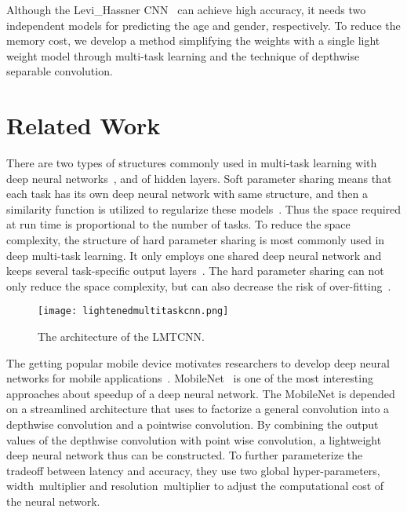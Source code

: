 \documentclass[times, 10pt,twocolumn]{article}
\begin{document}
Although the Levi\_Hassner CNN~\cite{levi2015age} can achieve high accuracy, it needs two independent models for predicting the age and gender, respectively. 
To reduce the memory cost, we develop a method simplifying the weights with a single light weight model through multi-task learning and the technique of depthwise separable convolution.

\section{Related Work} \label{sec:relatedwork}

There are two types of structures commonly used in multi-task learning with deep neural networks~\cite{ruder2017overview},  and  of hidden layers. 
Soft parameter sharing means that each task has its own deep neural network with same structure, and then a similarity function is utilized to regularize these models~\cite{yang2016trace}. 
Thus the space required at run time is proportional to the number of tasks. 
To  reduce the space complexity, the structure of hard parameter sharing is most commonly used in deep multi-task learning. 
It only employs one shared deep neural network and keeps several task-specific output layers~\cite{zhang2014facial}.
The hard parameter sharing can not only reduce the space complexity, but can also decrease the risk of over-fitting~\cite{baxter1997bayesian}.


\begin{figure}
\centering
\texttt{[image: lightenedmultitaskcnn.png]}
\caption{The architecture of the LMTCNN.}
\label{fig:lightenedmultitaskcnn}
\end{figure}




The getting popular mobile device motivates researchers to develop deep neural networks for mobile applications~\cite{howard2017mobilenets,li2017deeprebirth,zhang2017shufflenet, kim2015compression}.
MobileNet~\cite{howard2017mobilenets} is one of the most interesting approaches about speedup of a deep neural network. 
The MobileNet is depended on a streamlined architecture that uses  to factorize a general convolution into a depthwise convolution and a pointwise convolution. 
By combining the output values of the depthwise convolution with point wise convolution, a lightweight deep neural network thus can be constructed. 
To further parameterize the tradeoff between latency and accuracy, they use two global hyper-parameters, width~multiplier and resolution~multiplier to adjust the computational cost of the neural network.
\end{document}

